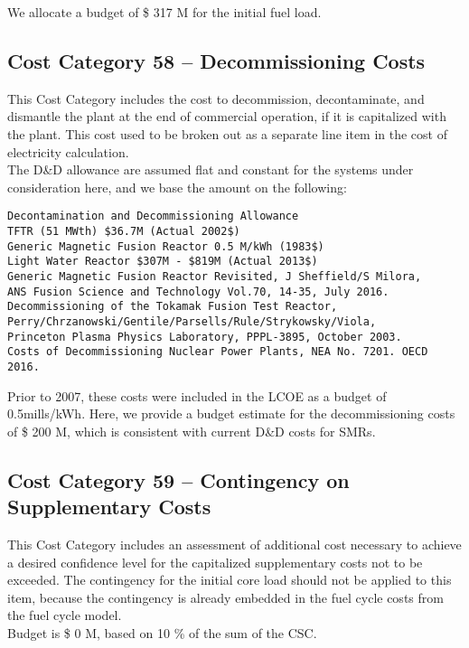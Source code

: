 We allocate a budget of \$ 317 M for the initial fuel load.  

\subsection*{Cost Category 58 – Decommissioning Costs}
This Cost Category includes the cost to decommission, decontaminate, and dismantle the plant at the end of commercial operation, if it is capitalized with the plant.  This cost used to be broken out as a separate line item in the cost of electricity calculation.\\

The D\&D allowance are assumed flat and constant for the systems under consideration here, and we base the amount on the following:

\begin{verbatim} 
Decontamination and Decommissioning Allowance 
TFTR (51 MWth) $36.7M (Actual 2002$) 
Generic Magnetic Fusion Reactor 0.5 M/kWh (1983$) 
Light Water Reactor $307M - $819M (Actual 2013$) 
Generic Magnetic Fusion Reactor Revisited, J Sheffield/S Milora,  
ANS Fusion Science and Technology Vol.70, 14-35, July 2016. 
Decommissioning of the Tokamak Fusion Test Reactor,
Perry/Chrzanowski/Gentile/Parsells/Rule/Strykowsky/Viola, 
Princeton Plasma Physics Laboratory, PPPL-3895, October 2003.
Costs of Decommissioning Nuclear Power Plants, NEA No. 7201. OECD 2016.
\end{verbatim} 

Prior to 2007, these costs were included in the LCOE as a budget of 0.5mills/kWh.  Here, we provide a budget estimate for the decommissioning costs of \$ 200 M, which is consistent with current D\&D costs for SMRs. 

\subsection*{Cost Category 59 – Contingency on Supplementary Costs}
This Cost Category includes an assessment of additional cost necessary to achieve a desired confidence level for the capitalized supplementary costs not to be exceeded. The contingency for the initial core load should not be applied to this item, because the contingency is already embedded in the fuel cycle costs from the fuel cycle model.\\

Budget is \$ 0 M, based on 10 \% of the sum of the CSC.
